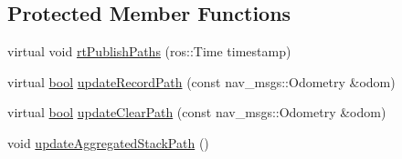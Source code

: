 \subsection*{Protected Member Functions}
\begin{DoxyCompactItemize}
\item 
virtual void \hyperlink{classcl__move__base__z_1_1odom__tracker_1_1OdomTracker_a8f728f85d1f3f49f4b94e37052a59d6d}{rt\+Publish\+Paths} (ros\+::\+Time timestamp)
\item 
virtual \hyperlink{classbool}{bool} \hyperlink{classcl__move__base__z_1_1odom__tracker_1_1OdomTracker_a77a66083573c6bef726d77447fb53349}{update\+Record\+Path} (const nav\+\_\+msgs\+::\+Odometry \&odom)
\item 
virtual \hyperlink{classbool}{bool} \hyperlink{classcl__move__base__z_1_1odom__tracker_1_1OdomTracker_abe7ba4dbf014e1f2c64b5806ce42c073}{update\+Clear\+Path} (const nav\+\_\+msgs\+::\+Odometry \&odom)
\item 
void \hyperlink{classcl__move__base__z_1_1odom__tracker_1_1OdomTracker_a7922f1e1e688a2ed62d32d9914985a9f}{update\+Aggregated\+Stack\+Path} ()
\end{DoxyCompactItemize}
